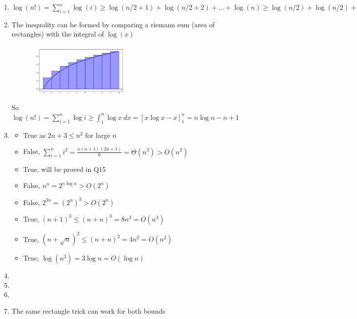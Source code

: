 \documentclass[12pt]{report}
\begin{document}
\begin{enumerate}[label=\textbf{\arabic*.}]
  \item $\log(n!) = \sum_{i=1}^{n} \log(i) \geq \log(n/2+1) + \log(n/2+2) + \dots + \log(n) \geq \log(n/2) + \log(n/2) 
  + \dots + \log(n/2) = (n/2) \log(n/2) = (n/2) (\log n - 1) = (1/2) n \log n - n/2$

  \item The inequality can be formed by comparing a riemann sum (area of rectangles) with the integral of $\log(x)$
  \begin{figure}[H]
    \centering
    \includegraphics[width=0.5\textwidth]{logxGraph.png}  
  \end{figure}
  So $\log(n!) = \sum_{i=1}^{n} \log i \geq \int_{1}^{n} \log x \ dx = [x \log x - x]_1^n = n \log n - n + 1$

  \item 
  \begin{itemize}
    \item True as $2n+3 \leq n^2$ for large $n$
    \item False, $\sum_{i=1}^{n} i^2 = \frac{n(n+1)(2n+1)}{6} = \Theta(n^3) > O(n^2)$
    \item True, will be proved in Q15 
    \item False, $n^n = 2^{n \log n} > O(2^n)$
    \item False, $2^{3n} = {(2^n)}^3 > O(2^n)$
    \item True, ${(n+1)}^3 \leq {(n+n)}^3 = 8n^3 = O(n^3)$
    \item True, ${(n+\sqrt{n})}^2 \leq {(n+n)}^2 = 4n^2 = O(n^2)$
    \item True, $\log(n^3) = 3 \log n = O(\log n)$
  \end{itemize}

  \item
  \item
  \item 
  \item The same rectangle trick can work for both bounds
    

\end{enumerate}
\end{document}

